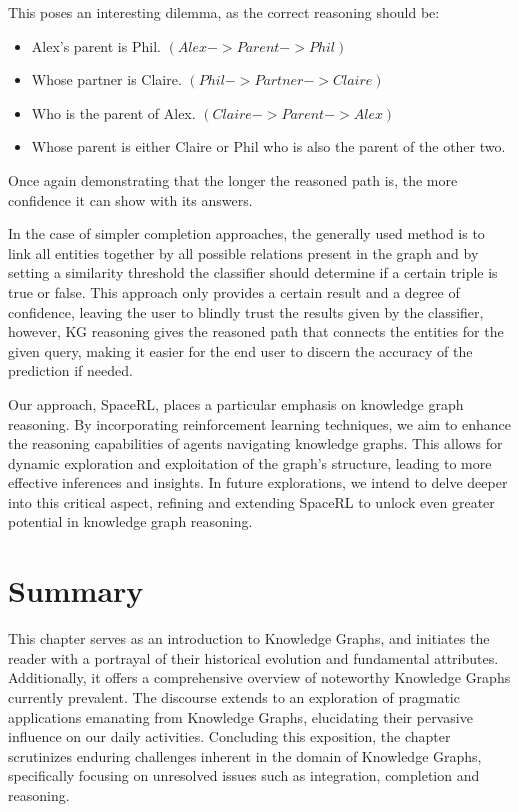 \begin{itemize}
    This poses an interesting dilemma, as the correct reasoning should be:
    \begin{itemize}
        \item Alex's parent is Phil. $(Alex -> Parent -> Phil)$
        \item Whose partner is Claire. $(Phil -> Partner -> Claire)$
        \item Who is the parent of Alex. $(Claire -> Parent -> Alex)$
        \item Whose parent is either Claire or Phil who is also the parent of the other two.
    \end{itemize}
    
    Once again demonstrating that the longer the reasoned path is, the more confidence it can show with its answers.

\end{itemize}

In the case of simpler completion approaches, the generally used method is to link all entities together by all possible relations present in the graph and by setting a similarity threshold the classifier should determine if a certain triple is true or false. This approach only provides a certain result and a degree of confidence, leaving the user to blindly trust the results given by the classifier, however, KG reasoning gives the reasoned path that connects the entities for the given query, making it easier for the end user to discern the accuracy of the prediction if needed.

Our approach, SpaceRL, places a particular emphasis on knowledge graph reasoning. By incorporating reinforcement learning techniques, we aim to enhance the reasoning capabilities of agents navigating knowledge graphs. This allows for dynamic exploration and exploitation of the graph's structure, leading to more effective inferences and insights. In future explorations, we intend to delve deeper into this critical aspect, refining and extending SpaceRL to unlock even greater potential in knowledge graph reasoning.

\section{Summary}\label{sec:kgs-summary}
This chapter serves as an introduction to Knowledge Graphs, and initiates the reader with a portrayal of their historical evolution and fundamental attributes. Additionally, it offers a comprehensive overview of noteworthy Knowledge Graphs currently prevalent. The discourse extends to an exploration of pragmatic applications emanating from Knowledge Graphs, elucidating their pervasive influence on our daily activities. Concluding this exposition, the chapter scrutinizes enduring challenges inherent in the domain of Knowledge Graphs, specifically focusing on unresolved issues such as integration, completion and reasoning.
